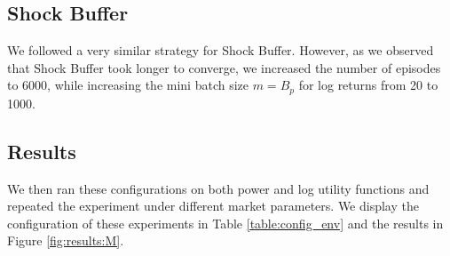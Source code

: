 \subsection{Shock Buffer}

We followed a very similar strategy for Shock Buffer. However, as we observed that Shock Buffer took longer to converge, we increased the number of episodes to 6000, while increasing the mini batch size $m=B_p$ for log returns from 20 to 1000.
\pagebreak
\subsection{Results}
We then ran these configurations on both power and log utility functions and repeated the experiment under different market parameters. We display the configuration of these experiments in Table \ref{table:config_env} and the results in Figure \ref{fig:results:M}.

